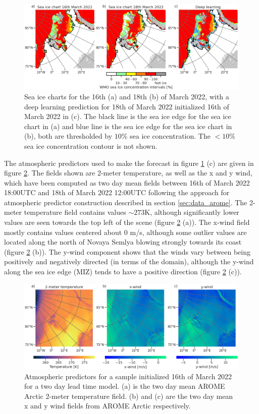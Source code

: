\documentclass[../main/thesis.tex]{subfiles}
\begin{document}
\begin{figure}
    \centering
    \includegraphics[width=\textwidth]{predictions}
    \caption{\label{fig:case_preds}Sea ice charts for the 16th (a) and 18th (b) of March 2022, with a deep learning prediction for 18th of March 2022 initialized 16th of March 2022 in (c). The black line is the sea ice edge for the sea ice chart in (a) and blue line is the sea ice edge for the sea ice chart in (b), both are thresholded by $10\%$ sea ice concentration. The $<10\%$ sea ice concentration contour is not shown.}
\end{figure}

The atmospheric predictors used to make the forecast in figure \ref{fig:case_preds} (c) are given in figure \ref{fig:case_atmos}. The fields shown are 2-meter temperature, as well as the x and y wind, which have been computed as two day mean fields between 16th of March 2022 18:00UTC and 18th of March 2022 12:00UTC following the approach for atmospheric predictor construction described in section \ref{sec:data_arome}. The 2-meter temperature field contains values $\sim 273$K, although significantly lower values are seen towards the top left of the scene (figure \ref{fig:case_atmos} (a)). The x-wind field mostly contains values centered about 0 m/s, although some outlier values are located along the north of Novaya Semlya blowing strongly towards its coast (figure \ref{fig:case_atmos} (b)). The y-wind component shows that the winds vary between being positively and negatively directed (in terms of the domain), although the y-wind along the sea ice edge (MIZ) tends to have a positive direction (figure \ref{fig:case_atmos} (c)).

\begin{figure}
    \centering
    \includegraphics[width=\textwidth]{atmosphere}
    \caption{\label{fig:case_atmos}Atmospheric predictors for a sample initialized 16th of March 2022 for a two day lead time model. (a) is the two day mean AROME Arctic 2-meter temperature field. (b) and (c) are the two day mean x and y wind fields from AROME Arctic respectively.}
\end{figure}
\end{document}
